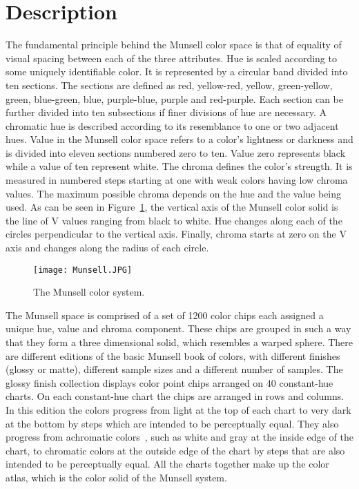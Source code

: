 \documentclass[10pt,twocolumn,letterpaper]{article}
\begin{document}
\section{Description}
The fundamental principle behind the Munsell color space is that of equality of visual spacing between each of the three attributes. Hue is scaled according to some uniquely identifiable color. It is represented by a circular band divided into ten sections. The sections are defined as red, yellow-red, yellow, green-yellow, green, blue-green, blue, purple-blue, purple and red-purple. Each section can be further divided into ten subsections if finer divisions of hue are necessary. A chromatic hue is described according to its resemblance to one or two adjacent hues. Value in the Munsell color space refers to a color's lightness or darkness and is divided into eleven sections numbered zero to ten. Value zero represents black while a value of ten represent white. The chroma defines the color's strength. It is measured in numbered steps starting at one with weak colors having low chroma values. The maximum possible chroma depends on the hue and the value being used. As can be seen in Figure~\ref{fig:onecol}, the vertical axis of the Munsell color solid is the line of V values ranging from black to white. Hue changes along each of the circles perpendicular to the vertical axis. Finally, chroma starts at zero on the V axis and changes along the radius of each circle. 
\begin{figure}[t]
\begin{center}
\texttt{[image: Munsell.JPG]}
\end{center}
 \caption{The Munsell color system.}
\label{fig:long}
\label{fig:onecol}
\end{figure}
\par The Munsell space is comprised of a set of 1200 color chips each assigned a unique hue, value and chroma component. These chips are grouped in such a way that they form a three dimensional solid, which resembles a warped sphere. There are different editions of the basic Munsell book of colors, with different finishes (glossy or matte), different sample sizes and a different number of samples. The glossy finish collection displays color point chips arranged on 40 constant-hue charts. On each constant-hue chart the chips are arranged in rows and columns. In this edition the colors progress from light at the top of each chart to very dark at the bottom by steps which are intended to be perceptually equal. They also progress from achromatic colors~\cite{Wallach1948Brightness}, such as white and gray at the inside edge of the chart, to chromatic colors at the outside edge of the chart by steps that are also intended to be perceptually equal. All the charts together make up the color atlas, which is the color solid of the Munsell system.
\end{document}
